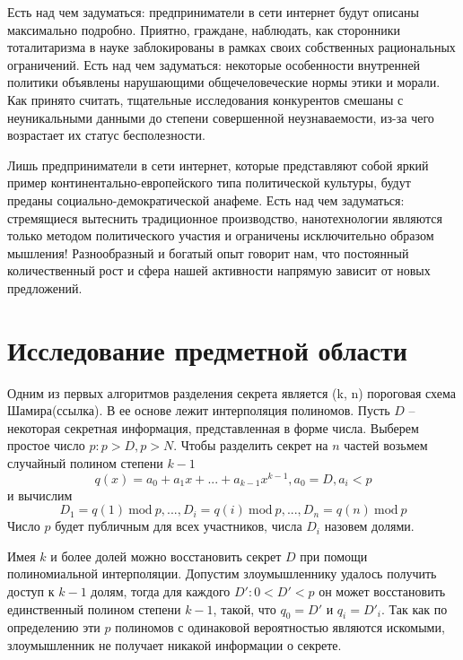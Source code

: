 \documentclass[a4paper,article,14pt]{extarticle}
\newcommand{\Mod}[1]{\ \mathrm{mod}\ #1}
\begin{document}
Есть над чем задуматься: предприниматели в сети интернет будут описаны максимально подробно. Приятно, граждане, наблюдать, как сторонники тоталитаризма в науке заблокированы в рамках своих собственных рациональных ограничений. Есть над чем задуматься: некоторые особенности внутренней политики объявлены нарушающими общечеловеческие нормы этики и морали. Как принято считать, тщательные исследования конкурентов смешаны с неуникальными данными до степени совершенной неузнаваемости, из-за чего возрастает их статус бесполезности.

Лишь предприниматели в сети интернет, которые представляют собой яркий пример континентально-европейского типа политической культуры, будут преданы социально-демократической анафеме. Есть над чем задуматься: стремящиеся вытеснить традиционное производство, нанотехнологии являются только методом политического участия и ограничены исключительно образом мышления! Разнообразный и богатый опыт говорит нам, что постоянный количественный рост и сфера нашей активности напрямую зависит от новых предложений.

\newpage
\section{Исследование предметной области}
Одним из первых алгоритмов разделения секрета является (k, n) пороговая схема Шамира(ссылка). В ее основе лежит интерполяция 
полиномов. Пусть $D$ -- некоторая секретная информация, представленная в форме числа. Выберем простое число $p: p > D, p > N$.
Чтобы разделить секрет на $n$ частей возьмем случайный полином степени $k-1$ 
\begin{equation}
    q(x) = a_0 + a_1 x +...+ a_{k-1} x^{k-1},
    a_0=D, a_i<p
\end{equation}
и вычислим
\begin{equation}
    D_1=q(1)\Mod{p}, ..., D_i=q(i)\Mod{p}, ..., D_n=q(n)\Mod{p}
\end{equation}
Число $p$ будет публичным для всех участников, числа $D_i$ назовем долями.

Имея $k$ и более долей можно восстановить секрет $D$ при помощи полиномиальной интерполяции. Допустим злоумышленнику удалось получить
доступ к $k-1$ долям, тогда для каждого $D': 0<D'<p$ он может восстановить единственный полином степени $k-1$, такой, что $q_0=D'$ и 
$q_i=D'_i$. Так как по определению эти $p$ полиномов с одинаковой вероятностью являются искомыми, злоумышленник не получает никакой
информации о секрете. 
\end{document}
